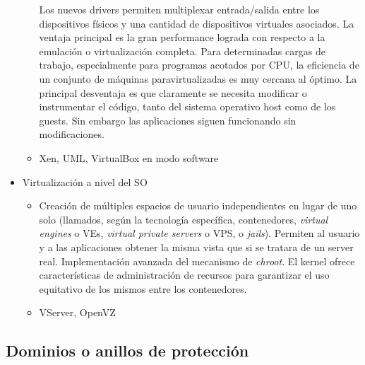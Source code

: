\begin{itemize}
\begin{itemize}
Los nuevos drivers permiten multiplexar entrada/salida entre los dispositivos físicos y una cantidad de dispositivos virtuales asociados. La ventaja principal es la gran performance lograda con respecto a la emulación o virtualización completa. Para determinadas cargas de trabajo, especialmente para programas acotados por CPU, la eficiencia de un conjunto de máquinas paravirtualizadas es muy cercana al óptimo. La principal desventaja es que claramente se necesita modificar o instrumentar el código, tanto del sistema operativo host como de los guests. Sin embargo las aplicaciones siguen funcionando sin modificaciones.
			\item  Xen, UML, VirtualBox en modo software
		\end{itemize}
		\item Virtualización a nivel del SO
	\begin{itemize}
		\item Creación de múltiples espacios de usuario independientes en lugar de uno solo (llamados, según la tecnología específica, contenedores, \textit{virtual engines} o VEs, \textit{virtual private servers} o VPS, o \textit{jails}). Permiten al usuario y a las aplicaciones obtener la misma vista que si se tratara de un server real. Implementación avanzada del mecanismo de \textit{chroot}. El kernel ofrece características de administración de recursos para garantizar el uso equitativo de los mismos entre los contenedores. 
		\item VServer, OpenVZ
	\end{itemize}
\end{itemize}

\subsection {Dominios o anillos de protección}


